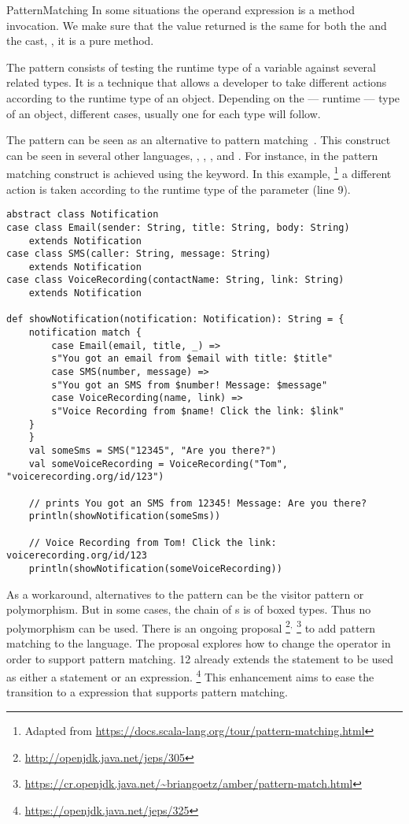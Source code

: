 \begin{pattern}{PatternMatching}
In some situations the operand expression is a method invocation.
We make sure that the value returned is the same for both the  and the cast, \ie, it is a pure method.

\discussion{}
The \thisp{} pattern consists of testing the runtime type of a variable against several related types.
It is a technique that allows a developer to take different actions according to the runtime type of an object.
Depending on the --- runtime --- type of an object, different cases, usually one for each type will follow.

The \thisp{} pattern can be seen as an \adhoc{} alternative to pattern matching~\citep{lavilleLazyPatternMatching1987}.
This construct can be seen in several other languages, \eg, \scala{}, \csharp{}, and \haskell{}.
For instance, in \scala{} the pattern matching construct is achieved using the  keyword.
In this example,%
\footnote{Adapted from \url{https://docs.scala-lang.org/tour/pattern-matching.html}}
a different action is taken according to the runtime type of the parameter  (line 9).

\begin{verbatim}
abstract class Notification
case class Email(sender: String, title: String, body: String)
	extends Notification
case class SMS(caller: String, message: String)
	extends Notification
case class VoiceRecording(contactName: String, link: String)
	extends Notification

def showNotification(notification: Notification): String = {
	notification match {
		case Email(email, title, _) =>
		s"You got an email from $email with title: $title"
		case SMS(number, message) =>
		s"You got an SMS from $number! Message: $message"
		case VoiceRecording(name, link) =>
		s"Voice Recording from $name! Click the link: $link"
	}
	}
	val someSms = SMS("12345", "Are you there?")
	val someVoiceRecording = VoiceRecording("Tom", "voicerecording.org/id/123")
	
	// prints You got an SMS from 12345! Message: Are you there?
	println(showNotification(someSms))
	
	// Voice Recording from Tom! Click the link: voicerecording.org/id/123	
	println(showNotification(someVoiceRecording))
\end{verbatim}

As a workaround, alternatives to the \thisp{} pattern can be the visitor pattern or polymorphism.
But in some cases, the chain of s is of boxed types.
Thus no polymorphism can be used.
There is an ongoing proposal%
\footnote{\url{http://openjdk.java.net/jeps/305}}$^{,}$%
\footnote{\url{https://cr.openjdk.java.net/~briangoetz/amber/pattern-match.html}}
to add pattern matching to the \java{} language.
The proposal explores how to change the  operator in order to support pattern matching.
\java{} 12 already extends the  statement to be used as either a statement or an expression.%
\footnote{\url{https://openjdk.java.net/jeps/325}}
This enhancement aims to ease the transition to a  expression that supports pattern matching.


\end{pattern}
